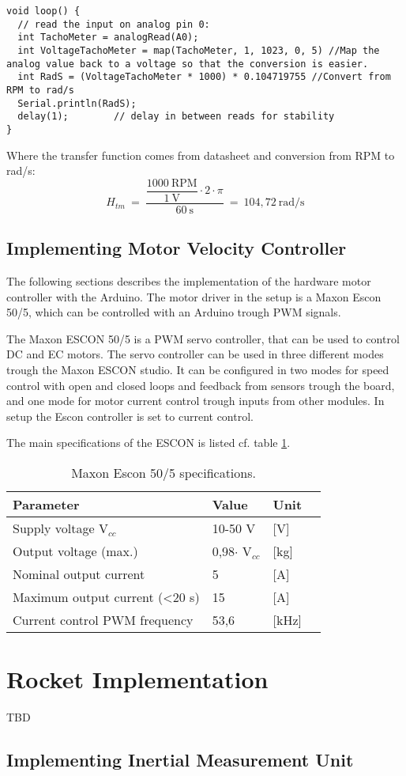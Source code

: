 \begin{lstlisting}
void loop() {
  // read the input on analog pin 0:
  int TachoMeter = analogRead(A0);
  int VoltageTachoMeter = map(TachoMeter, 1, 1023, 0, 5) //Map the analog value back to a voltage so that the conversion is easier.
  int RadS = (VoltageTachoMeter * 1000) * 0.104719755 //Convert from RPM to rad/s
  Serial.println(RadS);
  delay(1);        // delay in between reads for stability
}
\end{lstlisting}  

Where the transfer function comes from datasheet and conversion from RPM to rad/s:
\begin{equation}
H_{tm}\ =\ \dfrac{\dfrac{1000\ \text{RPM}}{1\ \text{V}} \cdot 2 \cdot \pi}{60\ \text{s}}\ =\ 104,72\ \text{rad/s}
\end{equation}

\subsection{Implementing Motor Velocity Controller}
The following sections describes the implementation of the hardware motor controller with the Arduino. The motor driver in the setup is a Maxon Escon 50/5, which can be controlled with an Arduino trough PWM signals. 

The Maxon ESCON 50/5 is a PWM servo controller, that can be used to control DC and EC motors. The servo controller can be used in three different modes trough the Maxon ESCON studio. It can be configured in two modes for speed control with open and closed loops and feedback from sensors trough the board, and one mode for motor current control trough inputs from other modules. In setup the Escon controller is set to current control.


The main specifications of the ESCON is listed cf. table \ref{MaxonSpecifications}.

\begin{table}[htbp]
	\centering
	\begin{tabular}{llll}
	\hline
	Parameter & Value & Unit \\ \hline
	Supply voltage V$_{cc}$& 10-50 V & {[}V{]} \\
	Output voltage (max.) & 0,98$\cdot$ V$_{cc}$& {[}kg{]} \\
	Nominal output current & 5 & {[}A{]} \\
	Maximum output current (<20 s) & 15 & {[}A{]}\\
	Current control PWM frequency & 53,6 & {[}kHz{]}
	\end{tabular}
\caption{Maxon Escon 50/5 specifications.}
\label{MaxonSpecifications}
\end{table}



\section{Rocket Implementation}
TBD

\subsection{Implementing Inertial Measurement Unit}